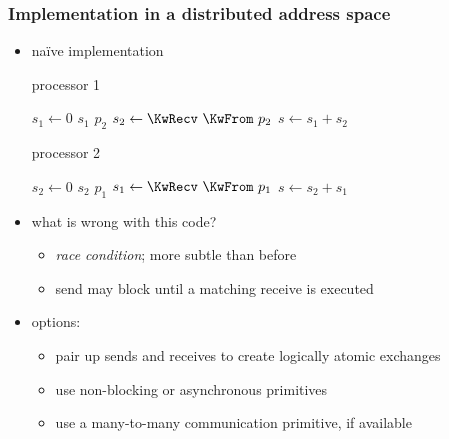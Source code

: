 \begin{frame}[fragile]
%
  \frametitle{Implementation in a distributed address space}
%
  \begin{itemize}
%
  \item na\"ive implementation

    \vspace{.5em}
    \begin{minipage}{.40\linewidth}
      \begin{algorithm}[H]
%
        \footnotesize
        \DontPrintSemicolon
        \NoCaptionOfAlgo
        \SetAlCapHSkip{0ex}
%
        \caption{\hspace{1em}processor 1}
        \vspace{.5em}
%
        $s_{1} \leftarrow 0$ \;
        \KwSend $s_{1}$ \KwTo $p_{2}$ \;
        $s_{2} \leftarrow \KwRecv\ \KwFrom\ p_{2}$ \;
        $s \leftarrow s_{1}+s_{2}$ \;
%
        \vspace{.5em}
%
      \end{algorithm}
    \end{minipage}
%
    \hspace{.1\linewidth}
%
    \begin{minipage}{.40\linewidth}
      \begin{algorithm}[H]
%
        \footnotesize
        \DontPrintSemicolon
        \NoCaptionOfAlgo
        \SetAlCapHSkip{0ex}
%
        \caption{\hspace{1em}processor 2}
        \vspace{.5em}
%
        $s_{2} \leftarrow 0$ \;
        \KwSend $s_{2}$ \KwTo $p_{1}$ \;
        $s_{1} \leftarrow \KwRecv\ \KwFrom\ p_{1}$ \;
        $s \leftarrow s_{2}+s_{1}$ \;
%
        \vspace{.5em}
      \end{algorithm}
    \end{minipage}
    \vspace{.5em}
%
  \item what is wrong with this code? 
%
    \begin{itemize}
    \item {\em race condition}; more subtle than before
    \item send may block until a matching receive is executed  
    \end{itemize}
  \item options:
    \begin{itemize}
    \item pair up sends and receives to create logically atomic exchanges
    \item use non-blocking or asynchronous primitives
    \item use a many-to-many communication primitive, if available
    \end{itemize}
%
  \end{itemize}
%
\end{frame}

